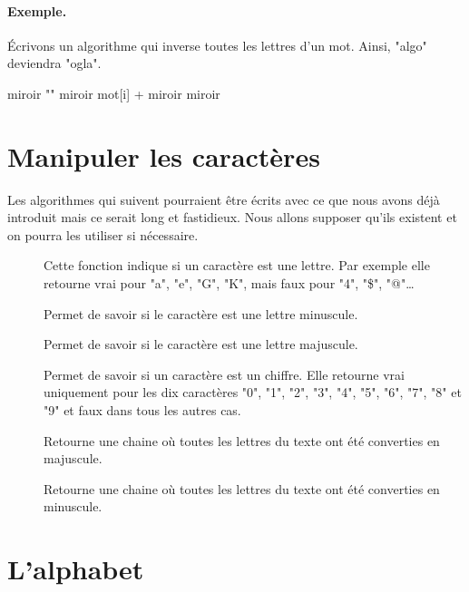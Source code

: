 	\paragraph{Exemple.}
	Écrivons un algorithme qui inverse toutes les lettres d’un mot.
	Ainsi, "algo" deviendra "ogla".
	\begin{LDA}
			\Let miroir \Gets ""
				\Let miroir \Gets mot[i] + miroir
			\EndFor
			\Return miroir
		\EndAlgo
	\end{LDA}
	
\section{Manipuler les caractères}

	Les algorithmes qui suivent pourraient être écrits
	avec ce que nous avons déjà introduit mais ce serait long
	et fastidieux. 
	Nous allons supposer qu’ils existent et on pourra les utiliser
	si nécessaire.
	
	\begin{description}
	\item[]
		Cette fonction indique si un caractère est une lettre. 
		Par exemple elle retourne vrai pour "a", "e", "G", "K", 
		mais faux pour "4", "\$", "@"\dots %
	\item[]	
		Permet de savoir si le caractère est une lettre minuscule.
	\item[]	
		Permet de savoir si le caractère est une lettre majuscule.
	\item[]	
		Permet de savoir si un caractère est un chiffre. 
		Elle retourne vrai uniquement pour les dix caractères 
		"0", "1", "2", "3", "4", "5", "6", "7", "8" et "9" 
		et faux dans tous les autres cas.
	\item[]
		Retourne une chaine où toutes les lettres du texte
		ont été converties en majuscule.
	\item[]
		Retourne une chaine où toutes les lettres du texte
		ont été converties en minuscule.
	\end{description}
	
\section{L’alphabet}

